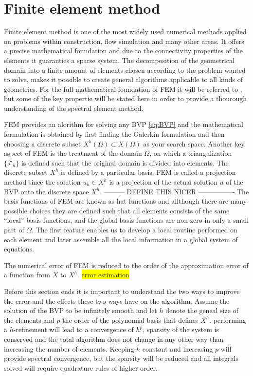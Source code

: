 \section{Finite element method}

Finite element method is one of the most widely used numerical methods applied on problems within construction, flow simulation and many 
other areas. It offers a precise mathematical foundation and due to the connectivity properties of the elements 
it guaranties a sparse system. The decomposition of the geometrical domain into a finite amount of elements chosen according to the problem 
wanted to solve, makes it possible to create general algorithms applicable to all kinds of geometries. 
For the full mathematical foundation of FEM it will be referred to \cite{Quarteroni}, but some of the key propertie will be stated here
in order to provide a thourough understanding of the spectral element method. 

FEM provides an alorithm for solving any BVP \ref{eq:BVP} and the mathematical formulation is obtained by first finding the Galerkin
formulation and then choosing a discrete subset $X^h(\Omega) \subset X(\Omega)$ as your search space. Another key aspect of FEM is the 
treatment of the domain $\Omega$, on which a triangulization $\{\mathcal{T}_h\}$ is defined such that the original domain is divided into elements.
The discrete subset $X^h$ is defined by a particular basis. FEM is called a projection method since the solution $u_h\in X^h$ is a projection
of the actual solution $u$ of the BVP onto the discrete space $X^h$. 
--------- DEFINE THIS NICER ----------------
The basis functions of FEM are known as hat functions and allthough there are many possible choices they are defined such that all elements 
consists of the same ``local'' basis functions, and the global basis functions are non-zero in only a small part of $\Omega$. 
The first feature enables us to develop a local routine performed on each element and later assemble 
all the local information in a global system of equations. 

The numerical error of FEM is reduced to the order of the approximation error of a function from $X$ to $X^h$.
\colorbox{yellow}{error estimation}

Before this section ends it is important to understand the two ways to improve the error and the effects these two ways have on the algorithm. 
Assume the solution of the BVP to be infinitely smooth and let $h$ denote the geneal size of the elements
and $p$ the order of the polynomial basis that defines $X^h$. 
performing a $h$-refinement will lead to a convergence of $h^p$, sparsity of the system is conserved
and  the total algorithm does not change in any other way than increasing the number of elements.
Keeping $h$ constant and increasing $p$ will provide spectral convergence, but the sparsity will be reduced and all integrals solved will require 
quadrature rules of higher order. 

